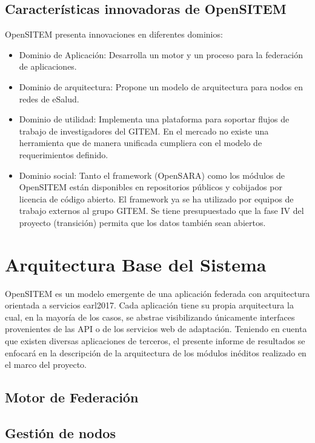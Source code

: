 \subsection{Características innovadoras de OpenSITEM}


OpenSITEM presenta innovaciones en diferentes dominios:

\begin{itemize}
 \item Dominio de Aplicación: Desarrolla un motor y un proceso para la federación de aplicaciones. 
 \item Dominio de arquitectura: Propone un modelo de arquitectura para nodos en redes de eSalud.
 \item Dominio de utilidad: Implementa una plataforma para soportar flujos de trabajo de investigadores del GITEM. En el mercado no existe una herramienta que de manera unificada cumpliera con el modelo de requerimientos definido.
 \item Dominio social: Tanto el framework (OpenSARA) como los módulos de OpenSITEM están disponibles en repositorios públicos y cobijados por licencia de código abierto. El framework ya se ha utilizado por equipos de trabajo externos al grupo GITEM. Se tiene presupuestado que la fase IV del proyecto (transición) permita que los datos también sean abiertos. 
\end{itemize}


\section{Arquitectura Base del Sistema}

OpenSITEM es un modelo emergente de una aplicación federada con arquitectura orientada a servicios {earl2017}. Cada aplicación tiene su propia arquitectura la cual, en la mayoría de los casos, se abstrae visibilizando únicamente interfaces provenientes de las API o de los servicios web de adaptación. Teniendo en cuenta que existen diversas aplicaciones de terceros, el presente informe de resultados se enfocará en la descripción de la arquitectura de los módulos inéditos realizado en el marco del proyecto.


\subsection{Motor de Federación}



\subsection{Gestión de nodos}

